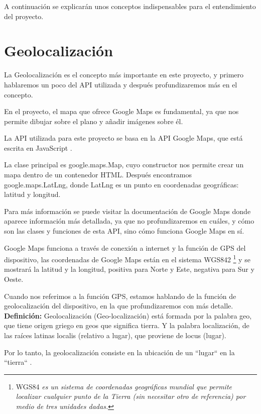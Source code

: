 
A continuación se explicarán unos conceptos indispensables para el entendimiento del proyecto.
\section{Geolocalización}\label{geolocalizacion}
La Geolocalización es el concepto más importante en este proyecto, y primero hablaremos un poco del API utilizada y después profundizaremos más en el concepto.

En el proyecto, el mapa que ofrece Google Maps es fundamental, ya que nos permite dibujar sobre el plano y añadir imágenes 
sobre él.

La API utilizada para este proyecto se basa en la API Google Maps, que está escrita en JavaScript \cite{googlemapsjs}.

La clase principal es google.maps.Map, cuyo constructor nos permite crear un mapa dentro de un contenedor HTML. Después encontramos google.maps.LatLng, donde LatLng es un punto en coordenadas geográficas: latitud y longitud.

Para más información se puede visitar la documentación de Google Maps donde aparece información más detallada, ya que no profundizaremos en cuáles, y cómo son las clases y funciones de esta API, sino cómo funciona Google Maps en sí.

Google Maps funciona a través de conexión a internet y la función de GPS del dispositivo, las coordenadas de Google Maps están en el sistema WGS842 \footnote{WGS84 \textit{es un sistema de coordenadas geográficas mundial que permite localizar cualquier punto de la Tierra (sin necesitar otro de referencia) por medio de tres unidades dadas.}} y se mostrará la latitud y la longitud, positiva para Norte y Este, negativa para Sur y Oeste.

Cuando nos referimos a la función GPS, estamos hablando de la función de geolocalización del dispositivo, en la que profundizaremos con más detalle.
\\

\textbf{Definición:} Geolocalización (Geo-localización) está formada por la palabra geo, que tiene origen griego en geos que significa tierra. Y la palabra localización, de las raíces latinas localis  (relativo a lugar), que proviene de locus (lugar).

Por lo tanto, la geolocalización consiste en la ubicación de un ``lugar`` en la ``tierra`` \cite{diccionarioetim}. 

